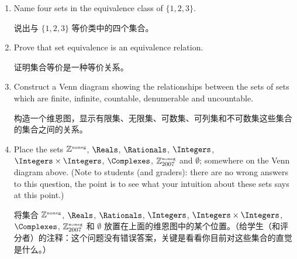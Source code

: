\begin{enumerate}
    \item Name four sets in the equivalence class of $\{1, 2, 3\}$.
    
    说出与 $\{1, 2, 3\}$ 等价类中的四个集合。
    \wbitemsep
    
    \item Prove that set equivalence is an equivalence relation.
    
    证明集合等价是一种等价关系。
    
    \wbvfill
    
    \workbookpagebreak
    
    \item Construct a Venn diagram showing the relationships between the sets of
    sets which are finite, infinite, countable, denumerable and uncountable.
    
    构造一个维恩图，显示有限集、无限集、可数集、可列集和不可数集这些集合的集合之间的关系。
    \wbvfill
    
    \item Place the sets ${\mathbb Z}^{\mbox{\tiny noneg}}$, $\Reals$, $\Rationals$, $\Integers$, $\Integers \times \Integers$, $\Complexes$, ${\mathbb Z}^{\mbox{\tiny noneg}}_{2007}$ and $\emptyset$;
    somewhere on the Venn diagram above. (Note to students (and graders): 
    there are no wrong answers to this question, the point is to see what 
    your intuition about these sets says at this point.)
    
    将集合 ${\mathbb Z}^{\mbox{\tiny noneg}}$, $\Reals$, $\Rationals$, $\Integers$, $\Integers \times \Integers$, $\Complexes$, ${\mathbb Z}^{\mbox{\tiny noneg}}_{2007}$ 和 $\emptyset$ 放置在上面的维恩图中的某个位置。（给学生（和评分者）的注释：这个问题没有错误答案，关键是看看你目前对这些集合的直觉是什么。）
    
    \wbvfill
    
    \end{enumerate}
     
